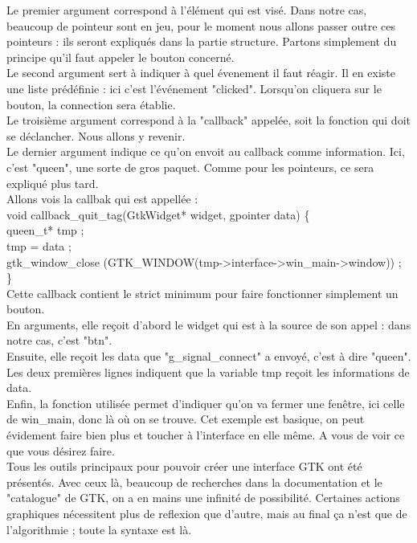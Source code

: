 \documentclass[11pt,french,a4paper]{report}
\begin{document}
Le premier argument correspond à l'élément qui est visé. Dans notre cas, beaucoup de pointeur sont en jeu,
pour le moment nous allons passer outre ces pointeurs : ils seront expliqués dans la partie structure. 
Partons simplement du principe qu'il faut appeler le bouton concerné.  \\
Le second argument sert à indiquer à quel évenement il faut réagir. Il en existe une liste prédéfinie : ici
c'est l'événement "clicked". Lorsqu'on cliquera sur le bouton, la connection sera établie. \\
Le troisième argument correspond à la "callback" appelée, soit la fonction qui doit se déclancher. Nous allons 
y revenir. \\
Le dernier argument indique ce qu'on envoit au callback comme information. Ici, c'est "queen", une sorte de 
gros paquet. Comme pour les pointeurs, ce sera expliqué plus tard. \\

Allons vois la callbak qui est appellée : \\
void callback\_quit\_tag(GtkWidget* widget, gpointer data) \{ \\                                      
    queen\_t* tmp ; \\                                                                             
    tmp = data ; \\                                                                               
    gtk\_window\_close (GTK\_WINDOW(tmp->interface->win\_main->window)) ; \\
\} \\

Cette callback contient le strict minimum pour faire fonctionner simplement un bouton.\\
En arguments, elle reçoit d'abord le widget qui est à la source de son appel : dans notre cas, c'est "btn". \\
Ensuite, elle reçoit les data que "g\_signal\_connect" a envoyé, c'est à dire "queen". \\
Les deux premières lignes indiquent que la variable tmp reçoit les informations de data. \\
Enfin, la fonction utilisée permet d'indiquer qu'on va fermer une fenêtre, ici celle de win\_main, donc là où on
se trouve. Cet exemple est basique, on peut évidement faire bien plus et toucher à l'interface en elle même. A 
vous de voir ce que vous désirez faire. \\

Tous les outils principaux pour pouvoir créer une interface GTK ont été présentés. Avec ceux là, beaucoup de recherches
dans la documentation et le "catalogue" %
de GTK, on a en mains une infinité de possibilité. Certaines actions graphiques nécessitent plus de reflexion que d'autre, mais 
au final ça n'est que de l'algorithmie ; toute la syntaxe est là. \\
\end{document}
